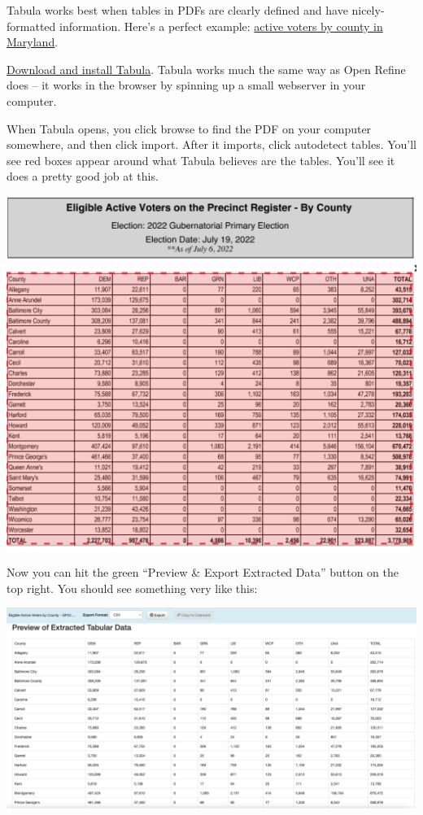 \documentclass[
  letterpaper,
  DIV=11,
  numbers=noendperiod]{scrreprt}
\begin{document}
Tabula works best when tables in PDFs are clearly defined and have
nicely-formatted information. Here's a perfect example:
\href{https://elections.maryland.gov/press_room/2020_stats/Eligible\%20Active\%20Voters\%20by\%20County\%20-\%20PG20.pdf}{active
voters by county in Maryland}.

\href{https://tabula.technology/}{Download and install Tabula}. Tabula
works much the same way as Open Refine does -- it works in the browser
by spinning up a small webserver in your computer.

When Tabula opens, you click browse to find the PDF on your computer
somewhere, and then click import. After it imports, click autodetect
tables. You'll see red boxes appear around what Tabula believes are the
tables. You'll see it does a pretty good job at this.

\includegraphics{./images/md_voters.png}

Now you can hit the green ``Preview \& Export Extracted Data'' button on
the top right. You should see something very like this:

\includegraphics{./images/md_voters2.png}
\end{document}
